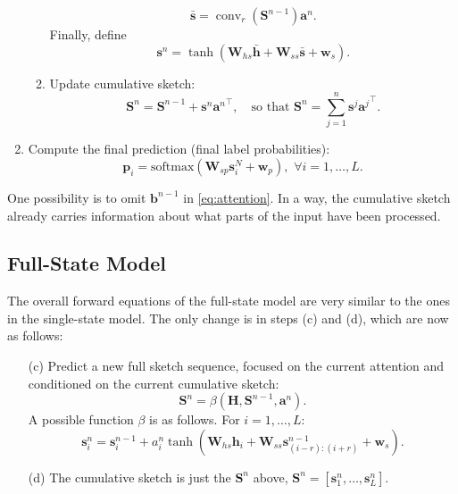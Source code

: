 \documentclass[10pt,a4paper]{article}
\newcommand{\matr}[1]{\mathbf{#1}}
\newcommand{\vectsymb}[1]{\boldsymbol{#1}}
\newcommand{\hh}{{\vectsymb{h}}}
\newcommand{\sss}{{\vectsymb{s}}}
\newcommand{\aaa}{{\vectsymb{a}}}
\newcommand{\bb}{{\vectsymb{b}}}
\newcommand{\HH}{{\matr{H}}}
\newcommand{\SSS}{{\matr{S}}}
\DeclareMathOperator{\conv}{conv}
\begin{document}
\begin{enumerate}
\begin{enumerate}
\begin{equation}
\bar{\sss} = \conv_r(\SSS^{n-1})\aaa^{n}.
\end{equation}
Finally, define
\begin{equation}
\sss^n = \tanh (\matr{W}_{hs}\bar{\hh} + \matr{W}_{ss}\bar{\sss} + \vectsymb{w}_s).
\end{equation}
\item Update cumulative sketch:
\begin{equation}
\SSS^n = \SSS^{n-1} + \sss^n {\aaa^n}^{\top}, 
\quad \text{so that $\SSS^n = \sum_{j=1}^n \sss^j {\aaa^j}^{\top}$}.
\end{equation}
\end{enumerate}
\item Compute the final prediction (final label probabilities):
\begin{equation}
\vectsymb{p}_i = \mathrm{softmax}(\matr{W}_{sp}\sss^{N}_i + \vectsymb{w}_p), \,\, \forall i = 1,\ldots,L.
\end{equation}
\end{enumerate}

One possibility is to omit 
$\bb^{n-1}$ in \eqref{eq:attention}. 
In a way, the cumulative sketch already carries information 
about what parts of the input have been processed.


\subsection{Full-State Model}

The overall forward equations of the full-state model are very similar to the ones in the single-state model. The only change is in steps (c) and (d), 
which are now as follows:
\begin{enumerate}
\item[(c)] Predict a new full sketch sequence, focused on the current attention and conditioned on the current cumulative sketch:
\begin{equation}
\SSS^n = \beta(\HH, \SSS^{n-1}, \aaa^{n}).
\end{equation}
A possible function $\beta$ is as follows. For $i=1,\ldots,L$:
\begin{equation}
\sss_i^n = \sss_i^{n-1} + a_i^n \tanh (\matr{W}_{hs}\hh_i + \matr{W}_{ss}\sss^{n-1}_{(i-r):(i+r)} + \vectsymb{w}_s).
\end{equation}
\item[(d)] The cumulative sketch is just the $\SSS^{n}$ above, 
$\SSS^{n} = [\sss_1^n, \ldots, \sss_L^n]$.
\end{enumerate}
\end{document}
